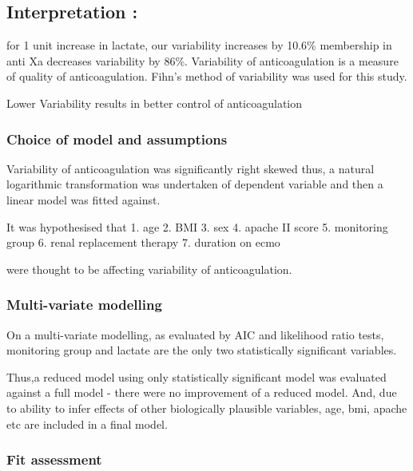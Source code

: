 \documentclass[
]{article}
\begin{document}
\hypertarget{interpretation-1}{%
\subsection{Interpretation :}\label{interpretation-1}}

for 1 unit increase in lactate, our variability increases by 10.6\%
membership in anti Xa decreases variability by 86\%. Variability of
anticoagulation is a measure of quality of anticoagulation. Fihn's
method of variability was used for this study.

Lower Variability results in better control of anticoagulation

\hypertarget{choice-of-model-and-assumptions}{%
\subsubsection{Choice of model and
assumptions}\label{choice-of-model-and-assumptions}}

Variability of anticoagulation was significantly right skewed thus, a
natural logarithmic transformation was undertaken of dependent variable
and then a linear model was fitted against.

It was hypothesised that 1. age 2. BMI 3. sex 4. apache II score 5.
monitoring group 6. renal replacement therapy 7. duration on ecmo

were thought to be affecting variability of anticoagulation.

\hypertarget{multi-variate-modelling}{%
\subsubsection{Multi-variate modelling}\label{multi-variate-modelling}}

On a multi-variate modelling, as evaluated by AIC and likelihood ratio
tests, monitoring group and lactate are the only two statistically
significant variables.

Thus,a reduced model using only statistically significant model was
evaluated against a full model - there were no improvement of a reduced
model. And, due to ability to infer effects of other biologically
plausible variables, age, bmi, apache etc are included in a final model.

\hypertarget{fit-assessment-1}{%
\subsubsection{Fit assessment}\label{fit-assessment-1}}
\end{document}
